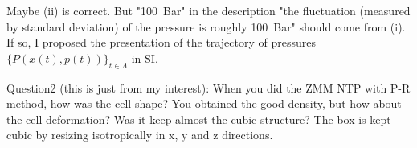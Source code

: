 \documentclass[a4paper,preprint,unsortedaddress,onecolumn,fleqn]{revtex4}
\newcommand{\recheck}[1]{{\color{red} #1}}
\begin{document}
{\color{blue}Maybe (ii) is correct. But "100~Bar" in the description "the
fluctuation (measured by standard deviation) of the pressure is roughly
100~Bar" should come from (i). If so, I proposed the presentation of the
trajectory of pressures $\{P(x(t),p(t))\}_{t\in \Lambda }$ in SI.}

{\color{blue}Question2 (this is just from my interest): When you did the ZMM
NTP with P-R method, how was the cell shape? You obtained the good density,
but how about the cell deformation? Was it keep almost the cubic structure?}
\recheck{The box is kept cubic by resizing isotropically in x, y and z directions.}

% 


{}
\end{document}
